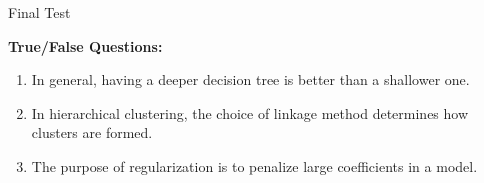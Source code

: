 \begin{center}\begin{large} Final Test
 \vspace{1em}
 
 \end{large}\end{center}
 \bigskip


\begin{problem} \textbf{True/False Questions:}

\begin{enumerate}




    





    \item In general, having a deeper  decision tree is better than a shallower one.

    \item In hierarchical clustering, the choice of linkage method determines how clusters are formed.


    \item The purpose of regularization is to penalize large coefficients in a model.


\end{enumerate}
    
\end{problem} 

